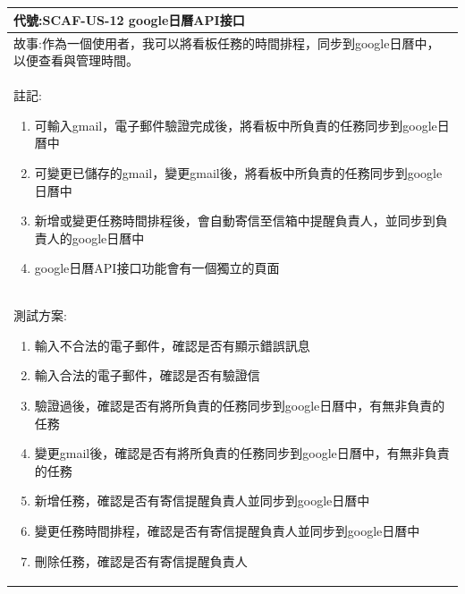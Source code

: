 \documentclass{report}
\begin{document}
\subsection*{}
\fontsize{12}{20}\selectfont
\begin{tabularx}{\textwidth}{|X|}
  \hline
  代號:SCAF-US-12 google日曆API接口 \\
  \hline
  故事:作為一個使用者，我可以將看板任務的時間排程，同步到google日曆中，以便查看與管理時間。 \\
  \hline
  註記:
  \begin{enumerate}
    \item 可輸入gmail，電子郵件驗證完成後，將看板中所負責的任務同步到google日曆中
    \item 可變更已儲存的gmail，變更gmail後，將看板中所負責的任務同步到google日曆中
    \item 新增或變更任務時間排程後，會自動寄信至信箱中提醒負責人，並同步到負責人的google日曆中
    \item google日曆API接口功能會有一個獨立的頁面
  \end{enumerate} \\
  \hline
  測試方案:
  \begin{enumerate}
    \item 輸入不合法的電子郵件，確認是否有顯示錯誤訊息
    \item 輸入合法的電子郵件，確認是否有驗證信
    \item 驗證過後，確認是否有將所負責的任務同步到google日曆中，有無非負責的任務
    \item 變更gmail後，確認是否有將所負責的任務同步到google日曆中，有無非負責的任務
    \item 新增任務，確認是否有寄信提醒負責人並同步到google日曆中
    \item 變更任務時間排程，確認是否有寄信提醒負責人並同步到google日曆中
    \item 刪除任務，確認是否有寄信提醒負責人
  \end{enumerate} \\
  \hline
\end{tabularx}
\end{document}
